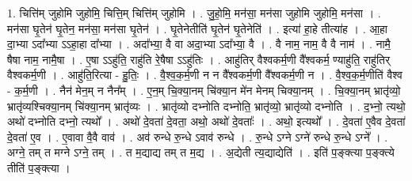 \documentclass[17pt]{extarticle}
\begin{document}
1. चित्ति॑म् जुहोमि जुहोमि॒ चित्ति॒म् चित्ति॑म् जुहोमि । . जु॒हो॒मि॒ मन॑सा॒ मन॑सा जुहोमि जुहोमि॒ मन॑सा । . मन॑सा घृ॒तेन॑ घृ॒तेन॒ मन॑सा॒ मन॑सा घृ॒तेन॑ । . घृ॒तेनेतीति॑ घृ॒तेन॑ घृ॒तेनेति॑ । . इत्या॑ हा॒हे तीत्या॑ह । . आ॒हा दा॒भ्या ऽदा᳚भ्या ऽऽहा॒हा दा᳚भ्या । . अदा᳚भ्या॒ वै वा अदा॒भ्या ऽदा᳚भ्या॒ वै । . वै नाम॒ नाम॒ वै वै नाम॑ । . नामै॒ षैषा नाम॒ नामै॒षा । . ए॒षा ऽऽहु॑ति॒ राहु॑ति रे॒षैषा ऽऽहु॑तिः । . आहु॑तिर् वैश्वकर्म॒णी वै᳚श्वकर्म॒ ण्याहु॑ति॒ राहु॑तिर् वैश्वकर्म॒णी । . आहु॑ति॒रित्या - हु॒तिः॒ । . वै॒श्व॒क॒र्म॒णी न न वै᳚श्वकर्म॒णी वै᳚श्वकर्म॒णी न । . वै॒श्व॒क॒र्म॒णीति॑ वैश्व - क॒र्म॒णी । . नैन॑ मेन॒म् न नैन᳚म् । . ए॒न॒म् चि॒क्या॒नम् चि॑क्या॒न मे॑न मेनम् चिक्या॒नम् । . चि॒क्या॒नम् भ्रातृ॑व्यो॒ भ्रातृ॑व्यश्चिक्या॒नम् चि॑क्या॒नम् भ्रातृ॑व्यः । . भ्रातृ॑व्यो दभ्नोति दभ्नोति॒ भ्रातृ॑व्यो॒ भ्रातृ॑व्यो दभ्नोति । . द॒भ्नो॒ त्यथो॒ अथो॑ दभ्नोति दभ्नो॒ त्यथो᳚ । . अथो॑ दे॒वता॑ दे॒वता॒ अथो॒ अथो॑ दे॒वताः᳚ । . अथो॒ इत्यथो᳚ । . दे॒वता॑ ए॒वैव दे॒वता॑ दे॒वता॑ ए॒व । . ए॒वावा वै॒वै वाव॑ । . अव॑ रुन्धे रु॒न्धे ऽवाव॑ रुन्धे । . रु॒न्धे ऽग्ने ऽग्ने॑ रुन्धे रु॒न्धे ऽग्ने᳚ । . अग्ने॒ तम् त मग्ने ऽग्ने॒ तम् । . त म॒द्याद्य तम् त म॒द्य । . अ॒द्येती त्य॒द्याद्येति॑ । . इति॑ प॒ङ्क्त्या प॒ङ्क्त्ये तीति॑ प॒ङ्क्त्या । \newline
\end{document}
